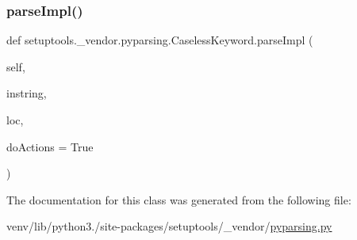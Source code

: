 \subsubsection{\texorpdfstring{parse\+Impl()}{parseImpl()}}
{\footnotesize\ttfamily def setuptools.\+\_\+vendor.\+pyparsing.\+Caseless\+Keyword.\+parse\+Impl (\begin{DoxyParamCaption}\item[{}]{self,  }\item[{}]{instring,  }\item[{}]{loc,  }\item[{}]{do\+Actions = {\ttfamily True} }\end{DoxyParamCaption})}



The documentation for this class was generated from the following file\+:\begin{DoxyCompactItemize}
\item 
venv/lib/python3./site-\/packages/setuptools/\+\_\+vendor/\hyperlink{setuptools_2__vendor_2pyparsing_8py}{pyparsing.\+py}\end{DoxyCompactItemize}
